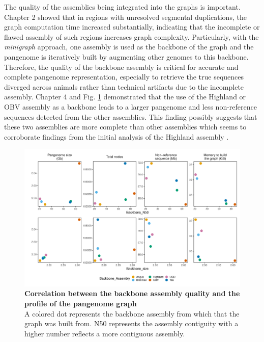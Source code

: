 \documentclass[../main.tex]{subfiles}
\begin{document}
The quality of the assemblies being integrated into the graphs is important. Chapter 2 showed that in regions with unresolved segmental duplications, the graph computation time increased substantially, indicating that the incomplete or flawed assembly of such regions increases graph complexity. Particularly, with the \emph{minigraph} approach, one assembly is used as the backbone of the graph and the pangenome is iteratively built by augmenting other genomes to this backbone. Therefore, the quality of the backbone assembly is critical for accurate and complete pangenome representation, especially to retrieve the true sequences diverged across animals rather than technical artifacts due to the incomplete assembly. Chapter 4 and Fig. \ref{fig52:backeff}  demonstrated that the use of the Highland or OBV assembly as a backbone leads to a larger pangenome and less non-reference sequences detected from the other assemblies. This finding possibly suggests that these two assemblies are more complete than other assemblies which seems to corroborate findings from the initial analysis of the Highland assembly \citep{rice2020continuous}. 

\begin{figure}[!htb]
   \centering
   \includegraphics[width=\textwidth]{discuss/fig52.pdf}
       \vspace{1mm}
       \caption[Correlation between the backbone assembly quality and the profile of the pangenome graph]{\textbf{Correlation between the backbone assembly quality and the profile of the pangenome graph} \\
       \footnotesize{A colored dot represents the backbone assembly from which that the graph was built from. 
        N50 represents the assembly contiguity with a higher number reflects a more contiguous assembly. 
       }}
       \label{fig52:backeff}
\end{figure}
\end{document}

